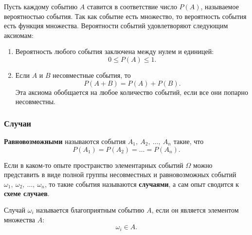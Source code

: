 \documentclass[a4paper]{article}
\newcommand{\key}[1]{{\bfseries\color{Medium} #1}}
\begin{document}
                Пусть каждому событию $A$ ставится в соответствие число $P(A)$, называемое вероятностью события. Так как событие есть множество, то вероятность события есть функция множества. Вероятности событий удовлетворяют следующим аксиомам:
                \begin{enumerate}
                    \item Вероятность любого события заключена между нулем и единицей:
                        \begin{equation*}
                            0 \leqslant P(A) \leqslant 1 .
                        \end{equation*}
                    \item Если $A$ и $B$ несовместные события, то
                        \begin{equation*}
                            P(A + B) = P(A) + P(B) .
                        \end{equation*}
                        Эта аксиома обобщается на любое количество событий, если все они попарно несовместны.
                \end{enumerate}

            \subsubsection{Случаи}

                \key{Равновозможными} называются события $A_1 , \: A_2 , \: \ldots , \: A_n$ такие, что
                \begin{equation*}
                    P(A_1) = P(A_2) = \ldots = P(A_n) .
                \end{equation*}
                
                Если в каком-то опыте пространство элементарных событий $\Omega$ можно представить в виде полной группы несовместных и равновозможных событий $\omega_1 , \: \omega_2 , \: \ldots , \: \omega_n$, то такие события называются \key{случаями}, а сам опыт сводится к \key{схеме случаев}.

                Случай $\omega_i$ называется благоприятным событию $A$, если он является элементом множества $A$:
                \begin{equation*}
                    \omega_i \in A .
                \end{equation*}
\end{document}
